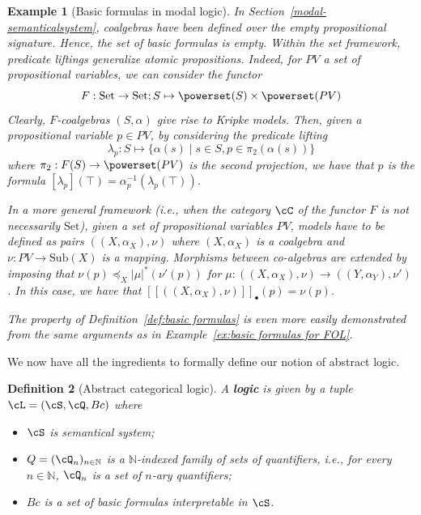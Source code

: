 \documentclass[preprint,3p,times]{elsarticle}
\newtheorem{definition}{Definition}[section]
\newtheorem{example}[definition]{Example}
\newcommand{\Set}{\mathrm{Set}}
\newcommand{\Sub}{\mathrm{Sub}}
\def\sem#1{[\![ #1 ] \!]}
\begin{document}
\begin{example}[Basic formulas in modal logic]
\label{ex:basic formula in modal logic}
In Section~\ref{modal-semanticalsystem}, coalgebras have been defined over the empty propositional signature. Hence, the set of basic formulas is empty. Within the set framework, predicate liftings generalize atomic propositions. Indeed, for $PV$ a set of propositional variables, we can consider the functor \[F : \Set \to \Set;S \mapsto \powerset(S) \times \powerset(PV)\] Clearly, $F$-coalgebras $(S,\alpha)$ give rise to Kripke models. Then, given a propositional variable $p \in PV$, by considering the predicate lifting 
\[\lambda_p : S \mapsto \{\alpha(s) \mid s \in S, p \in \pi_2(\alpha(s))\}\] 
where $\pi_2 : F(S) \to \powerset(PV)$ is the second projection, we have that $p$ is the formula $[\lambda_p](\top) = \alpha^{-1}_p (\lambda_p(\top))$. 

In a more general framework (i.e., when the category $\cC$ of the functor $F$ is not necessarily $\Set$), given a set of propositional variables $PV$, models have to be defined as pairs $((X,\alpha_X),\nu)$ where $(X,\alpha_X)$ is a coalgebra and $\nu : PV \to \Sub(X)$ is a mapping. Morphisms between co-algebras are extended by imposing that $\nu(p) \preceq_X |\mu|^*(\nu'(p))$ for $\mu : ((X,\alpha_X),\nu) \to ((Y,\alpha_Y),\nu')$. In this case, we have that $\sem{((X,\alpha_X),\nu)}_\bullet(p) = \nu(p)$.

The property of Definition~\ref{def:basic formulas} is even more easily demonstrated from the same arguments as in Example~\ref{ex:basic formulas for FOL}.
\end{example}

We now have all the ingredients to formally define our notion of abstract logic.

\begin{definition}[Abstract categorical logic]
\label{def:abstract logic}
A {\bf logic} is given by a tuple $\cL = (\cS,\cQ,Bc)$ where
\begin{itemize}
	\item $\cS$ is semantical system;
	\item $Q = (\cQ_n)_{n \in \mathbb{N}}$ is a $\mathbb{N}$-indexed family of sets of quantifiers, i.e., for every $n \in \mathbb{N}$, $\cQ_n$ is a set of $n$-ary quantifiers;
	\item $Bc$ is a set of basic formulas interpretable in $\cS$.
\end{itemize}
\end{definition}
\end{document}
